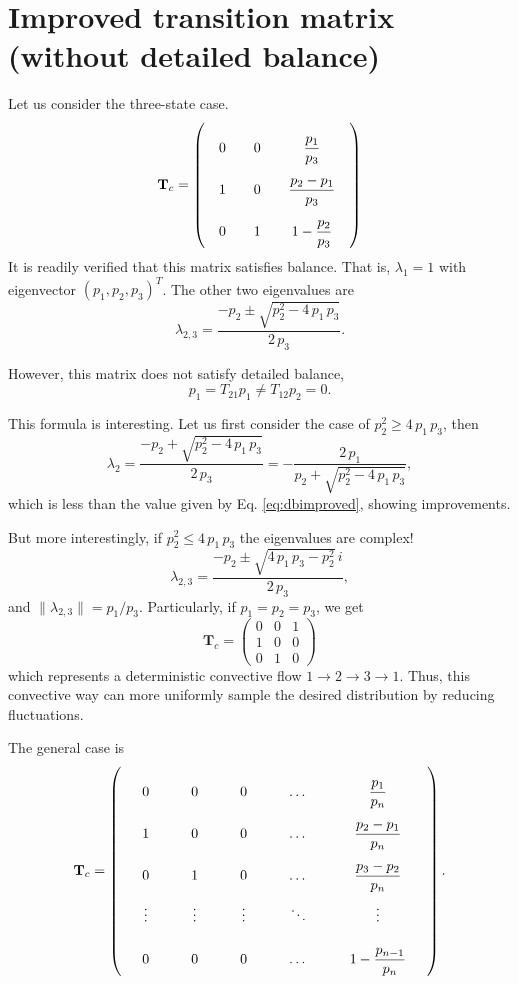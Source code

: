 \documentclass[12pt]{article}
\begin{document}
\section{Improved transition matrix (without detailed balance)}


Let us consider the three-state case.
$$
\mathbf T_c
=
\left(
  \arraycolsep=10.0pt\def\arraystretch{2.5}
  \begin{array}{ccc}
    0     &   0   &   \dfrac{p_1}{p_3}   \\
    1     &   0   &   \dfrac{p_2 - p_1}{p_3} \\
    0     &   1   &   1 - \dfrac{p_2}{p_3}
  \end{array}
\right)
$$
It is readily verified that this matrix satisfies balance.
That is, $\lambda_1 = 1$ with eigenvector $(p_1, p_2, p_3)^T$.
The other two eigenvalues are
$$
\lambda_{2,3}
=
\frac{-p_2 \pm \sqrt{p_2^2 - 4 \, p_1 \, p_3} } { 2 \, p_3 }.
$$

However, this matrix does not satisfy detailed balance,
$$
p_1 = T_{21} p_1 \ne T_{12} p_2 = 0.
$$


This formula is interesting.
Let us first consider the case of $p_2^2 \ge 4 \, p_1 \, p_3$,
then
$$
\lambda_2 =
\frac{-p_2 + \sqrt{p_2^2 - 4 \, p_1 \, p_3} } { 2 \, p_3 }
=
-\frac{2 \, p_1 }{p_2 + \sqrt{p_2^2 - 4 \, p_1 \, p_3} },
$$
which is less than the value given by Eq. \eqref{eq:dbimproved},
showing improvements.

But more interestingly, if $p_2^2 \le 4 \, p_1 \, p_3$
the eigenvalues are complex!
$$
\lambda_{2,3}
=
\frac{-p_2 \pm \sqrt{4 \, p_1 \, p_3 - p_2^2} \, i } { 2 \, p_3 },
$$
and $\|\lambda_{2,3}\| = p_1/p_3$.
%
Particularly, if $p_1 = p_2 = p_3$, we get
$$
\mathbf T_c
=
\left(
  \begin{array}{ccc}
    0     &   0   &   1   \\
    1     &   0   &   0 \\
    0     &   1   &   0
  \end{array}
\right)
$$
which represents a deterministic convective flow
$1\rightarrow 2 \rightarrow 3 \rightarrow 1$.
Thus, this convective way can more uniformly
sample the desired distribution by reducing fluctuations.

The general case is
$$
\mathbf T_c
=
\left(
  \arraycolsep=15.0pt\def\arraystretch{2.5}
  \begin{array}{cccccc}
    0     &   0   &   0   &   \dots  &   \dfrac{p_1}{p_n}       \\
    1     &   0   &   0   &   \dots  &   \dfrac{p_2 - p_1}{p_n} \\
    0     &   1   &   0   &   \dots  &   \dfrac{p_3 - p_2}{p_n} \\
    \vdots&\vdots &\vdots &   \ddots &   \vdots \\
    0     &   0   &   0   &   \dots  &   1- \dfrac{p_{n-1}}{p_n} \\
  \end{array}
\right).
$$
\end{document}

